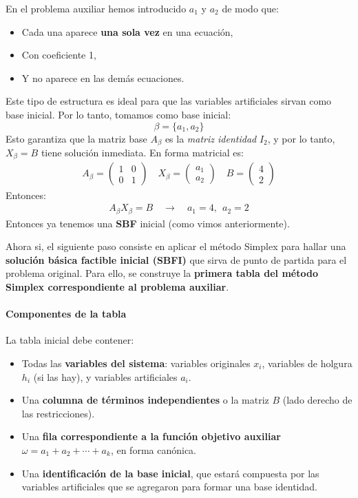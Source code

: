 En el problema auxiliar hemos introducido \(a_1\) y \(a_2\) de modo que:
\begin{itemize}
  \item Cada una aparece \textbf{una sola vez} en una ecuación,
  \item Con coeficiente 1,
  \item Y no aparece en las demás ecuaciones.
\end{itemize}
Este tipo de estructura es ideal para que las variables artificiales sirvan como base inicial. Por lo tanto, tomamos como base inicial:
\[
  \beta = \{a_1, a_2\}
\]
Esto garantiza que la matriz base \(A_\beta\) es la \textit{matriz identidad} \(I_2\), y por lo tanto, \(X_\beta = B\) tiene solución inmediata. En forma matricial es:
\begin{align*}
  A_\beta =
  \begin{pmatrix}
    1 & 0\\
    0 & 1
  \end{pmatrix}
  \quad
  X_\beta =
  \begin{pmatrix}
    a_1\\
    a_2
  \end{pmatrix}
  \quad
  B =
  \begin{pmatrix}
    4\\
    2
  \end{pmatrix}
\end{align*}
Entonces:
\begin{align*}
  A_\beta X_\beta = B \quad \rightarrow \quad {a_1} = 4, ~~ {a_2} = 2
\end{align*}
Entonces ya tenemos una \textbf{SBF} inicial (como vimos anteriormente).

Ahora si, el siguiente paso consiste en aplicar el método Simplex para hallar una \textbf{solución básica factible inicial (SBFI)} que sirva de punto de partida para el problema original. Para ello, se construye la \textbf{primera tabla del método Simplex correspondiente al problema auxiliar}.

\paragraph{Componentes de la tabla}

La tabla inicial debe contener:

\begin{itemize}
  \item Todas las \textbf{variables del sistema}: variables originales \(x_i\), variables de holgura \(h_i\) (si las hay), y variables artificiales \(a_i\).
  \item Una \textbf{columna de términos independientes} o la matriz \(B\) (lado derecho de las restricciones).
  \item Una \textbf{fila correspondiente a la función objetivo auxiliar} \(\omega = a_1 + a_2 + \cdots + a_k\), en forma canónica.
  \item Una \textbf{identificación de la base inicial}, que estará compuesta por las variables artificiales que se agregaron para formar una base identidad.
\end{itemize}

